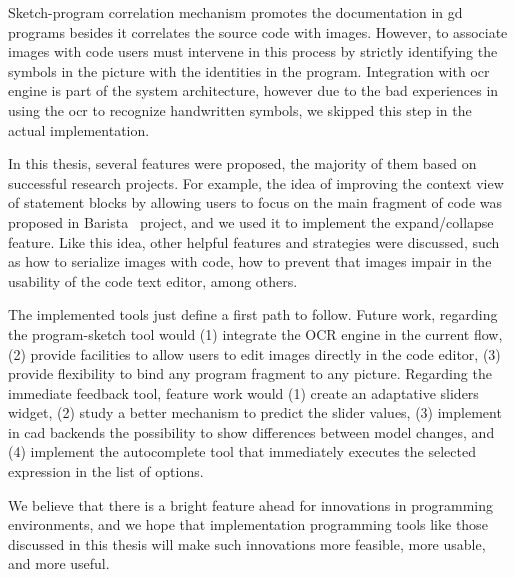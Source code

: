 Sketch-program correlation mechanism promotes the documentation in \gls{gd} programs besides it correlates the source code with images. However, to associate images with code users must intervene in this process by strictly identifying the symbols in the picture with the identities in the program. Integration with \gls{ocr} engine is part of the system architecture, however due to the bad experiences in using the \gls{ocr} to recognize handwritten symbols, we skipped this step in the actual implementation.

In this thesis, several features were proposed, the majority of them based on successful research projects. For example, the idea of improving the context view of statement blocks by allowing users to focus on the main fragment of code was proposed in Barista~\cite{ko2006barista} project, and we used it to implement the expand/collapse feature. Like this idea, other helpful features and strategies were discussed, such as how to serialize images with code, how to prevent that images impair in the usability of the code text editor, among others.

The implemented tools just define a first path to follow.  Future work, regarding the program-sketch tool would (1) integrate the OCR engine in the current flow, (2) provide facilities to allow users to edit images directly in the code editor, (3) provide flexibility to bind any program fragment to any picture. Regarding the immediate feedback tool, feature work would (1) create an adaptative sliders widget, (2) study a better mechanism to predict the slider values, (3) implement in \gls{cad} backends the possibility to show differences between model changes, and (4) implement the autocomplete tool that immediately executes the selected expression in the list of options.

We believe that there is a bright feature ahead for innovations in programming environments, and we hope that implementation programming tools like those discussed in this thesis will make such innovations more feasible, more usable, and more useful.
